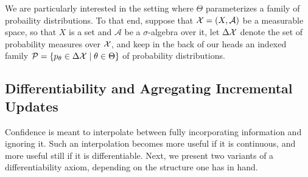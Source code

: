 \documentclass{article}
\begin{document}
\begin{phaseout}
%



We are particularly interested in the setting where $\Theta$ parameterizes a family of probaility distributions.
To that end, suppose that $\mathcal X = (X, \mathcal A)$ be a measurable space, so that $X$ is a set and $\mathcal A$ be a $\sigma$-algebra over it, let $\Delta \mathcal X$ denote the set of probability measures over $\mathcal X$,
and keep in the back of our heads an indexed family
$
	\mathcal P =
	\{ p_\theta \in\Delta\mathcal X \mid \theta \in \Theta \}
$ of probability distributions.
\end{phaseout}

%


\subsection{Differentiability and Agregating Incremental Updates}
Confidence is meant to interpolate between fully incorporating information and ignoring it.
Such an interpolation becomes more useful if it is continuous, and more useful still if it is differentiable.
Next, we present two variants of a differentiability axiom, depending on the structure one has in hand. 
\end{document}
